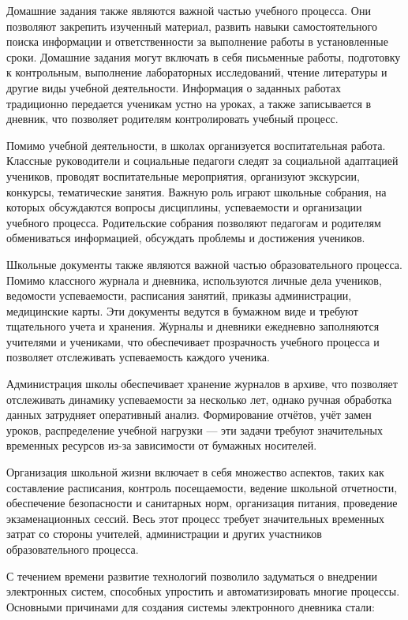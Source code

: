 \documentclass[a4paper, final]{article}
\begin{document}
Домашние задания также являются важной частью учебного процесса. Они позволяют закрепить изученный материал, развить навыки самостоятельного поиска информации и ответственности за выполнение работы в установленные сроки. Домашние задания могут включать в себя письменные работы, подготовку к контрольным, выполнение лабораторных исследований, чтение литературы и другие виды учебной деятельности. Информация о заданных работах традиционно передается ученикам устно на уроках, а также записывается в дневник, что позволяет родителям контролировать учебный процесс.

Помимо учебной деятельности, в школах организуется воспитательная работа. Классные руководители и социальные педагоги следят за социальной адаптацией учеников, проводят воспитательные мероприятия, организуют экскурсии, конкурсы, тематические занятия. Важную роль играют школьные собрания, на которых обсуждаются вопросы дисциплины, успеваемости и организации учебного процесса. Родительские собрания позволяют педагогам и родителям обмениваться информацией, обсуждать проблемы и достижения учеников.

Школьные документы также являются важной частью образовательного процесса. Помимо классного журнала и дневника, используются личные дела учеников, ведомости успеваемости, расписания занятий, приказы администрации, медицинские карты. Эти документы ведутся в бумажном виде и требуют тщательного учета и хранения. Журналы и дневники ежедневно заполняются учителями и учениками, что обеспечивает прозрачность учебного процесса и позволяет отслеживать успеваемость каждого ученика.

Администрация школы обеспечивает хранение журналов в архиве, что позволяет отслеживать динамику успеваемости за несколько лет, однако ручная обработка данных затрудняет оперативный анализ. Формирование отчётов, учёт замен уроков, распределение учебной нагрузки --- эти задачи требуют значительных временных ресурсов из-за зависимости от бумажных носителей.

Организация школьной жизни включает в себя множество аспектов, таких как составление расписания, контроль посещаемости, ведение школьной отчетности, обеспечение безопасности и санитарных норм, организация питания, проведение экзаменационных сессий. Весь этот процесс требует значительных временных затрат со стороны учителей, администрации и других участников образовательного процесса.

С течением времени развитие технологий позволило задуматься о внедрении электронных систем, способных упростить и автоматизировать многие процессы. Основными причинами для создания системы электронного дневника стали:
\end{document}
